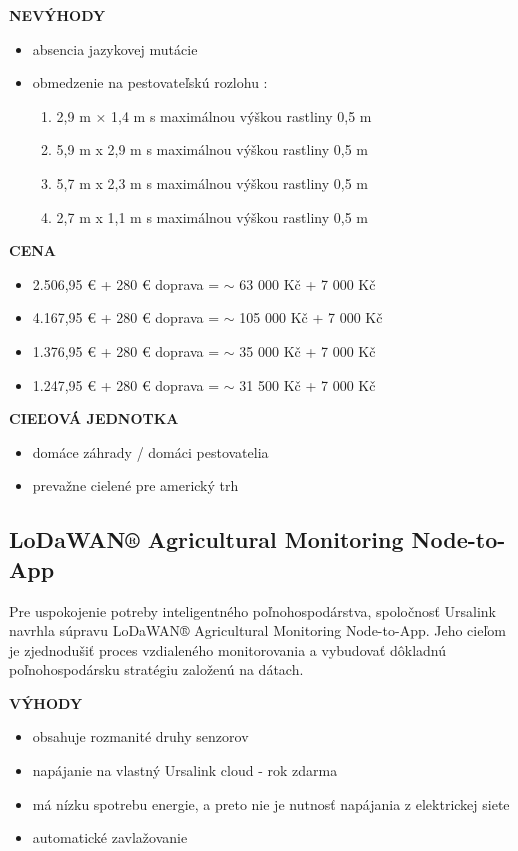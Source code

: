 \documentclass[twoside]{ctuthesis}
\theoremstyle{plain}
\theoremstyle{definition}
\theoremstyle{note}
\begin{document}
\textbf{NEVÝHODY}
\begin{itemize}
\item  absencia jazykovej mutácie
\item  obmedzenie na pestovateľskú rozlohu : 
	\begin{enumerate}
	\item 2,9 m × 1,4 m s maximálnou výškou rastliny 0,5 m
	\item 5,9 m x 2,9 m s maximálnou výškou rastliny 0,5 m
	\item 5,7 m x 2,3 m s maximálnou výškou rastliny 0,5 m
	\item 2,7 m x 1,1 m s maximálnou výškou rastliny 0,5 m
	\end{enumerate}
\end{itemize}
	
\textbf{CENA}
\begin{itemize}
\item 2.506,95 €  + 280 € doprava = $\sim$ 63 000 Kč + 7 000 Kč 
\item 4.167,95 € + 280 € doprava = $\sim$ 105 000 Kč + 7 000 Kč
\item 1.376,95 € + 280 € doprava = $\sim$ 35 000 Kč + 7 000 Kč
\item 1.247,95 € + 280 € doprava = $\sim$ 31 500 Kč + 7 000 Kč
\end{itemize}

\textbf{CIEĽOVÁ JEDNOTKA}
\begin{itemize}
\item domáce záhrady / domáci pestovatelia
\item prevažne cielené pre americký trh
\end{itemize}

\subsection*{LoDaWAN®  Agricultural Monitoring Node-to-App}
Pre uspokojenie potreby inteligentného poľnohospodárstva, spoločnosť Ursalink navrhla súpravu LoDaWAN®  Agricultural Monitoring Node-to-App. Jeho cieľom je zjednodušiť proces vzdialeného monitorovania a vybudovať dôkladnú poľnohospodársku stratégiu založenú na dátach.  \cite{lorawan}
\newline

\textbf{VÝHODY}
\begin{itemize}
\item obsahuje rozmanité druhy senzorov
\item napájanie na vlastný Ursalink cloud - rok zdarma
\item má nízku spotrebu energie, a preto nie je nutnosť napájania z elektrickej siete
\item automatické zavlažovanie
\end{itemize}
\end{document}
